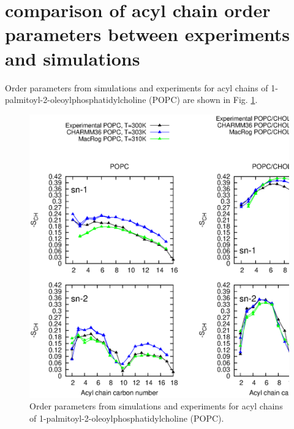 \documentclass[aps,prl,superscriptaddress,twocolumn]{revtex4}
\begin{document}
\section{comparison of acyl chain order parameters between experiments and simulations}
Order parameters from simulations and experiments for acyl chains of 1-palmitoyl-2-oleoylphosphatidylcholine (POPC)
are shown in Fig. \ref{OrderParametersCHOL}.




 \begin{figure}[]
  \centering
  \includegraphics[width=17.2cm]{../FIGS/OrderParametersCHOL.eps}

  \caption{\label{OrderParametersCHOL}
    Order parameters from simulations and experiments for acyl chains of  1-palmitoyl-2-oleoylphosphatidylcholine (POPC).}
  
\end{figure}
\end{document}
